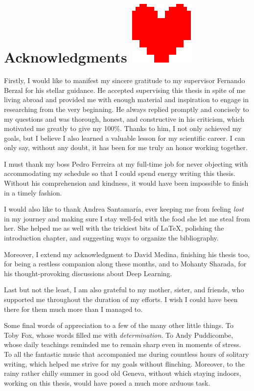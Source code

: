 
\chapter*{Acknowledgments \includegraphics[scale=0.1]{gfx/determination}}
\vspace*{-10mm}

Firstly, I would like to manifest my sincere gratitude to my supervisor Fernando Berzal for his stellar guidance.
He accepted supervising this thesis in spite of me living abroad and provided me with enough material and inspiration to engage in researching from the very beginning.
He always replied promptly and concisely to my questions and was thorough, honest, and constructive in his criticism, which motivated me greatly to give my 100\%.
Thanks to him, I not only achieved my goals, but I believe I also learned a valuable lesson for my scientific career.
I can only say, without any doubt, it has been for me truly an honor working together.

I must thank my boss Pedro Ferreira at my full-time job for never objecting with accommodating my schedule so that I could spend energy writing this thesis.
Without his comprehension and kindness, it would have been impossible to finish in a timely fashion.

I would also like to thank Andrea Santamaría, ever keeping me from feeling \emph{lost} in my journey and making sure I stay well-fed with the food she let me steal from her.
She helped me as well with the trickiest bits of \LaTeX, polishing the introduction chapter, and suggesting ways to organize the bibliography.

Moreover, I extend my acknowledgment to David Medina, finishing his thesis too, for being a restless companion along these months, and to Mohanty Sharada, for his thought-provoking discussions about Deep Learning.

Last but not the least, I am also grateful to my mother, sister, and friends, who supported me throughout the duration of my efforts.
I wish I could have been there for them much more than I managed to.

Some final words of appreciation to a few of the many other little things.
To Toby Fox, whose words filled me with \emph{determination}.
To Andy Puddicombe, whose daily teachings reminded me to remain sharp even in moments of stress.
To all the fantastic music that accompanied me during countless hours of solitary writing, which helped me strive for my goals without flinching.
Moreover, to the rainy rather chilly summer in good old Geneva, without which staying indoors, working on this thesis, would have posed a much more arduous task.
